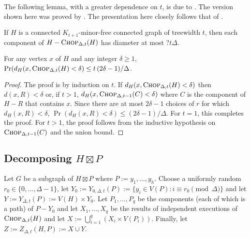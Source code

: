 \documentclass{patmorin}
\newcommand{\defin}[1]{\emph{\textcolor{brightmaroon}{#1}}}
\begin{document}
The following lemma, with a greater dependence on $t$, is due to \citet{klein.plotkin.ea:excluded}. The version shown here was proved by \citet{fakcharoenphol.talwar:improved}. The presentation here closely follows that of \citet{lee:simpler}.

\begin{lem}\label{component_diameter_h}
  If $H$ is a connected $K_{t+1}$-minor-free connected graph of treewidth $t$, then each component of $H-\textsc{Chop}_{\Delta,t}(H)$ has diameter at most $?t\Delta$.
\end{lem}



\begin{lem}\label{delta_bad_h}
  For any vertex $x$ of $H$ and any integer $\delta\ge 1$, $\Pr(d_H(x, \textsc{Chop}_{\Delta,t}(H)< \delta)\le t\,(2\delta-1)/\Delta$.
\end{lem}

\begin{proof}
  The proof is by induction on $t$.
  If $d_H(x,\textsc{Chop}_{\Delta,t}(H) < \delta)$ then $d(x,R)< \delta$ or, if $t>1$,  $d_H(x,\textsc{Chop}_{\Delta,t-1}(C) < \delta)$ where $C$ is the component of $H-R$ that contains $x$.  Since there are at most $2\delta-1$ choices of $r$ for which $d_H(x,R)<\delta$, $\Pr(d_H(x,R)<\delta) \le (2\delta-1)/\Delta$. For $t=1$, this completes the proof.  For $t>1$, the proof follows from the inductive hypothesis on $\textsc{Chop}_{\Delta,t-1}(C)$ and the union bound.
\end{proof}

\subsection{\boldmath Decomposing $H\boxtimes P$}

Let $G$ be a subgraph of $H\boxtimes P$ where $P:=y_1,\ldots,y_h$. Choose a uniformly random $r_0\in\{0,\ldots,\Delta-1\}$, let $Y_0:=Y_{0,\Delta,t}(P):=\{y_i\in V(P):i\equiv r_0\pmod\Delta\}$ and let $Y:=Y_{\Delta,t}(P):=V(H)\times Y_0$.  Let $P_1,\ldots,P_q$ be the components (each of which is a path) of $P-Y_0$ and let $X_1,\ldots,X_q$ be the results of independent executions of $\textsc{Chop}_{\Delta,t}(H)$ and let $X:=\bigcup_{i=1}^q (X_i\times V(P_i))$.  Finally, let $Z:=Z_{\Delta,t}(H,P):=X\cup Y$.
\end{document}
